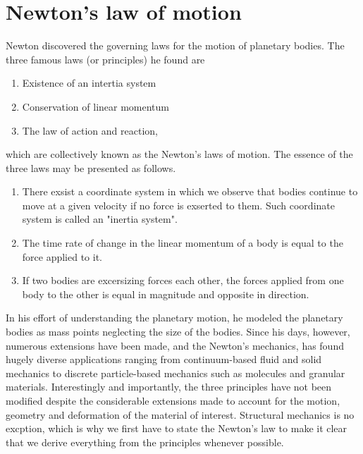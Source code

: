 \documentclass[10pt,a4j]{article}
\begin{document}
\section{Newton's law of motion}
Newton discovered the governing laws for the motion of planetary bodies. 
The three famous laws (or principles) he found are  
\begin{enumerate}
	\item Existence of an intertia system
	\item Conservation of linear momentum
	\item The law of action and reaction,
\end{enumerate}
which are collectively known as the Newton's laws of motion. 
The essence of the three laws may be presented as follows. 
\begin{enumerate}
\item 
	There exsist a coordinate system in which we observe that bodies continue to move at 
	a given velocity if no force is exserted to them.
	Such coordinate system is called an "inertia system".
\item
	The time rate of change in the linear momentum of a body is equal to the force applied to it.
\item
	If two bodies are excersizing forces each other, the forces applied from one body to 
	the other is equal in magnitude and opposite in direction.
\end{enumerate}
In his effort of understanding the planetary motion, he modeled the planetary 
bodies as mass points neglecting the size of the bodies. 
Since his days, however, numerous extensions have been made, and the Newton's mechanics,
has found hugely diverse applications ranging from continuum-based fluid and solid 
mechanics to discrete particle-based mechanics such as molecules and granular materials. 
Interestingly and importantly, the three principles have not been modified despite the 
considerable extensions made to account for the motion, geometry and deformation of the 
material of interest. Structural mechanics is no excption, which is why we first have to 
state the Newton's law to make it clear that we derive everything from the principles 
whenever possible. 
\\
\end{document}

